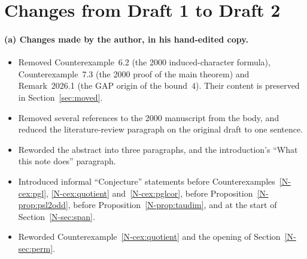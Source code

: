 \documentclass[12pt,letterpaper]{article}
\begin{document}
\section{Changes from Draft 1 to Draft 2}\label{sec:d1d2}

\paragraph{(a) Changes made by the author, in his hand-edited copy.}
\begin{itemize}[itemsep=1pt]
\item Removed Counterexample~6.2 (the 2000 induced-character formula),
  Counterexample~7.3 (the 2000 proof of the main theorem) and
  Remark~2026.1 (the GAP origin of the bound~$4$). Their content is
  preserved in Section~\ref{sec:moved}.
\item Removed several references to the 2000 manuscript from the body, and
  reduced the literature-review paragraph on the original draft to one
  sentence.
\item Reworded the abstract into three paragraphs, and the introduction's
  ``What this note does'' paragraph.
\item Introduced informal ``Conjecture'' statements before
  Counterexamples~\ref{N-cex:pgl}, \ref{N-cex:quotient} and~\ref{N-cex:pglcor},
  before Proposition~\ref{N-prop:psl2odd}, before
  Proposition~\ref{N-prop:taudim}, and at the start of
  Section~\ref{N-sec:span}.
\item Reworded Counterexample~\ref{N-cex:quotient} and the opening of
  Section~\ref{N-sec:perm}.
\end{itemize}
\end{document}
